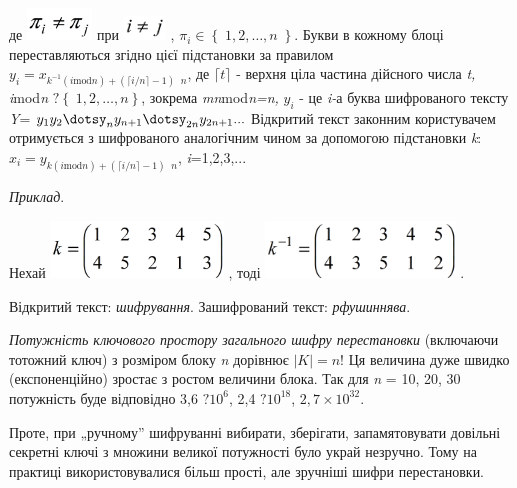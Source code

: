 де  \includegraphics[width=0.6811in,height=0.3339in]{crypt-img/crypt-img58.png} 
при  \includegraphics[width=0.4402in,height=0.252in]{crypt-img/crypt-img59.png}
,  ${\pi _{{i}}\in \left\{\;1,2,\dots,n\;\right\}}$. Букви в
кожному блоці переставляються згідно цієї підстановки за правилом 
${y_{{i}}=x_{{k^{{-1}}(i\text{mod}n)+\left(\lceil i/n\rceil -1\right)\;\;n}}}$,
 де   ${\lceil t\rceil }$ - верхня ціла частина дійсного числа
\textit{t}\textit{,  } \textit{i}mod\textit{n }
${?\left\{\;1,2,\dots,n\left.\right\}\right.}$, зокрема 
\textit{mn}mod\textit{n}\textit{=}\textit{n}\textit{, } ${y_{{i}}}$  {}- це 
\textit{i}\textit{{}-}а  буква шифрованого тексту \textit{Y}=
${y_{{1}}y_{{2}}\dotsy_{{n}}y_{{n+1}}\dotsy_{{2n}}y_{{2n+1}}\text{.}\text{.}\text{.}}$
Відкритий текст законним користувачем отримується з шифрованого аналогічним
чином за допомогою підстановки \textit{k}:  
${x_{{i}}=y_{{k(i\text{mod}n)+\left(\lceil i/n\rceil -1\right)\;\;n}}}$, 
\textit{i}=1,2,3,...

\textit{Приклад}. 

Нехай  
\includegraphics[width=1.8071in,height=0.598in]{crypt-img/crypt-img60.png} , 
тоді  
\includegraphics[width=1.9835in,height=0.5992in]{crypt-img/crypt-img61.png} .

Відкритий текст: \textit{шифрування}. Зашифрований текст: \textit{рфушиннява}. 

\textit{Потужність ключового простору загального шифру перестановки} (включаючи
тотожний ключ) з розміром блоку \textit{n}\textit{ }дорівнює  ${|K|=n}$!  Ця
величина дуже швидко (експоненційно)  зростає з ростом величини блока. Так для 
\textit{n}\textit{ }= 10, 20, 30  потужність буде відповідно 3,6
${?\text{10}^{{6}}}$,  2,4 ${?\text{10}^{{\text{18}}}}$,   ${2,7\times
\text{10}^{{\text{32}}}}$.

 Проте, при „ручному” шифруванні  вибирати,  зберігати,
запам{\textquotesingle}ятовувати довільні  секретні  ключі з множини великої
потужності було украй незручно.  Тому на практиці використовувалися більш
прості, але зручніші шифри перестановки.


